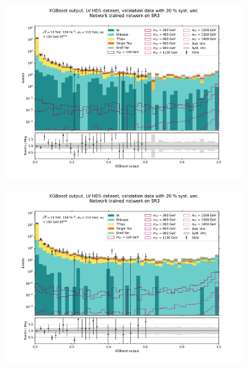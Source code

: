 \documentclass[12pt, a4paper]{book}
\begin{document}
\begin{figure}[!ht]
	\centering
	\begin{subfigure}[b]{0.49\textwidth}
      \centering
      \includegraphics[width=1\textwidth]{XGBoost/Model_independent/150/LV_HDS/VAL_ee.pdf}
   \end{subfigure}
   \hfill
   \begin{subfigure}[b]{0.49\textwidth}
      \centering
      \includegraphics[width=1\textwidth]{XGBoost/Model_independent/150/LV_HDS/VAL_uu.pdf}
   \end{subfigure}
   \hfill
   \begin{subfigure}[b]{0.49\textwidth}
      \centering

\end{subfigure}
\end{figure}
\end{document}
